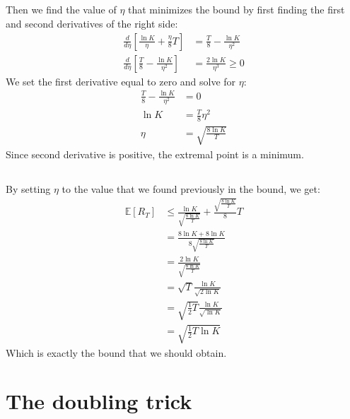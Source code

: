 \documentclass[a4paper]{article}
\begin{document}
\subsection{}
\label{subsec:22}
Then we find the value of $\eta$ that minimizes the bound by first finding the
first and second derivatives of the right side:
\begin{align*}
  \frac{d}{d\eta} \left[\frac{\ln{K}}{\eta} + \frac{\eta}{8}T\right]&=
  \frac{T}{8} - \frac{\ln{K}}{\eta^2}\\
  \frac{d}{d\eta} \left[\frac{T}{8} - \frac{\ln{K}}{\eta^2} \right]
  &= \frac{2\ln{K}}{\eta^3} \geq 0 \tag{since $\eta > 0$ and $K>1$}
\end{align*}
We set the first derivative equal to zero and solve for $\eta$:
\begin{align*}
\frac{T}{8} - \frac{\ln{K}}{\eta^2} &= 0\\
\ln{K} &= \frac{T}{8}\eta^2\\
\eta &= \sqrt{\frac{8\ln{K}}{T}}
\end{align*}
Since second derivative is positive, the extremal point is a minimum.
\subsection{}
\label{subsec:23}
By setting $\eta$ to the value that we found previously in the bound, we get:
\begin{align*}
  \mathbb{E}\left[R_{T}\right] &\leq
  \frac{\ln K}{\sqrt{\frac{8\ln{K}}{T}}}+\frac{\sqrt{\frac{8\ln{K}}{T}}}{8} T\\
  &= \frac{8\ln{K} + 8\ln{K}} {8\sqrt{\frac{8\ln{K}}{T}}}\\
  &= \frac{2\ln{K}}{\sqrt{\frac{8\ln{K}}{T}}}\\
  &= \sqrt{T} \frac{\ln{K}}{\sqrt{2\ln{K}}}\\
  &= \sqrt{\frac{1}{2}T} \frac{\ln{K}}{\sqrt{\ln{K}}}\\
  &= \sqrt{\frac{1}{2}T \ln{K}}
\end{align*}
Which is exactly the bound that we should obtain.

\section{The doubling trick}
\label{sec:3}
\end{document}
